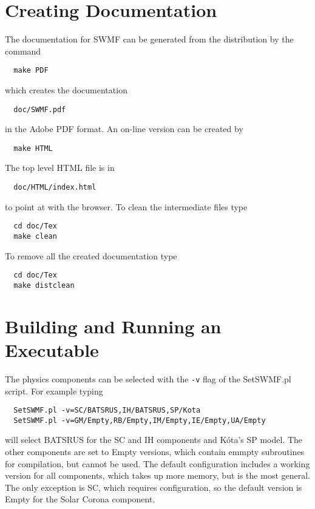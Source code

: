 \section{Creating Documentation}

The documentation for SWMF can be generated from the distribution by
the command
\begin{verbatim}
  make PDF
\end{verbatim}
which creates the documentation
\begin{verbatim}
  doc/SWMF.pdf
\end{verbatim}
in the Adobe PDF format.  An on-line version can be created by
\begin{verbatim}
  make HTML
\end{verbatim}
The top level HTML file is in
\begin{verbatim}
  doc/HTML/index.html
\end{verbatim}
to point at with the browser.  To clean the intermediate files type
\begin{verbatim}
  cd doc/Tex
  make clean
\end{verbatim}
To remove all the created documentation type
\begin{verbatim}
  cd doc/Tex
  make distclean
\end{verbatim}

\section{Building and Running an Executable}

The physics components can be selected with the {\tt -v} flag
of the SetSWMF.pl script. For example typing
\begin{verbatim}
  SetSWMF.pl -v=SC/BATSRUS,IH/BATSRUS,SP/Kota
  SetSWMF.pl -v=GM/Empty,RB/Empty,IM/Empty,IE/Empty,UA/Empty
\end{verbatim}
will select BATSRUS for the SC and IH components and K\'ota's SP model.
The other components are set to Empty versions, which contain emmpty
subroutines for compilation, but cannot be used.
The default configuration includes a working version for all components, 
which takes up more memory, but is the most general.
The only exception is SC, which requires configuration, so the 
default version is Empty for the Solar Corona component.

